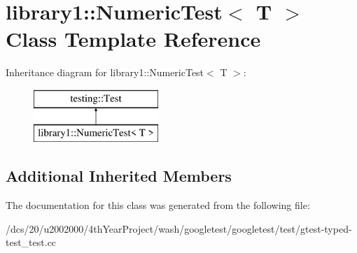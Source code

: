 \hypertarget{classlibrary1_1_1NumericTest}{}\section{library1\+:\+:Numeric\+Test$<$ T $>$ Class Template Reference}
\label{classlibrary1_1_1NumericTest}
Inheritance diagram for library1\+:\+:Numeric\+Test$<$ T $>$\+:\begin{figure}[H]
\begin{center}
\leavevmode
\includegraphics[height=2.000000cm]{classlibrary1_1_1NumericTest}
\end{center}
\end{figure}
\subsection*{Additional Inherited Members}


The documentation for this class was generated from the following file\+:\begin{DoxyCompactItemize}
\item 
/dcs/20/u2002000/4th\+Year\+Project/wash/googletest/googletest/test/gtest-\/typed-\/test\+\_\+test.\+cc\end{DoxyCompactItemize}
